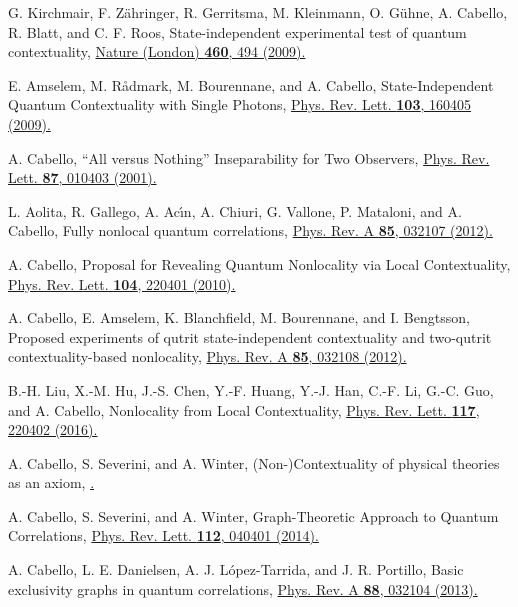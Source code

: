 \documentclass[%
 twocolumn,
 groupedaddress,
 showpacs,
 showkeys,
 preprintnumbers,
 amsmath,amssymb,
 aps,
 pra,
 longbibliography,
 floatfix,
 ]{revtex4-1}
\begin{document}
\begin{thebibliography}{99}
G. Kirchmair, F. Z\"{a}hringer, R. Gerritsma, M. Kleinmann, O. G\"{u}hne, A. Cabello, R. Blatt, and C. F. Roos,
State-independent experimental test of quantum contextuality,
\href{https://doi.org/10.1038/nature08172}{Nature (London) \textbf{460}, 494 (2009).}

E. Amselem, M. R{\aa}dmark, M. Bourennane, and A. Cabello,
State-Independent Quantum Contextuality with Single Photons,
\href{https://doi.org/10.1103/PhysRevLett.103.160405}{Phys. Rev. Lett. \textbf{103}, 160405 (2009).}

A. Cabello,
``All versus Nothing'' Inseparability for Two Observers,
\href{https://doi.org/10.1103/PhysRevLett.87.010403}{Phys. Rev. Lett. \textbf{87}, 010403 (2001).}

L. Aolita, R. Gallego, A. Ac\'{\i}n, A. Chiuri, G. Vallone, P. Mataloni, and A. Cabello,
Fully nonlocal quantum correlations,
\href{https://doi.org/10.1103/PhysRevA.85.032107}{Phys. Rev. A \textbf{85}, 032107 (2012).}

A. Cabello,
Proposal for Revealing Quantum Nonlocality via Local Contextuality,
\href{http://link.aps.org/doi/10.1103/PhysRevLett.104.220401}{Phys. Rev. Lett. \textbf{104}, 220401 (2010).}

A. Cabello, E. Amselem, K. Blanchfield, M. Bourennane, and I. Bengtsson,
Proposed experiments of qutrit state-independent contextuality and two-qutrit contextuality-based nonlocality,
\href{https://doi.org/10.1103/PhysRevA.85.032108}{Phys. Rev. A \textbf{85}, 032108 (2012).}

B.-H. Liu, X.-M. Hu, J.-S. Chen, Y.-F. Huang, Y.-J. Han, C.-F. Li, G.-C. Guo, and A. Cabello,
Nonlocality from Local Contextuality,
\href{https://doi.org/10.1103/PhysRevLett.117.220402}{Phys. Rev. Lett. \textbf{117}, 220402 (2016).}

A. Cabello, S. Severini, and A. Winter,
(Non-)Contextuality of physical theories as an axiom,
\href{https://arxiv.org/abs/1010.2163}{.}

A. Cabello, S. Severini, and A. Winter,
Graph-Theoretic Approach to Quantum Correlations,
\href{http://dx.doi.org/10.1103/PhysRevLett.112.040401}{Phys. Rev. Lett. \textbf{112}, 040401 (2014).}

A. Cabello, L. E. Danielsen, A. J. L\'opez-Tarrida, and J. R. Portillo,
Basic exclusivity graphs in quantum correlations,
\href{http://dx.doi.org/10.1103/PhysRevA.88.032104}{Phys. Rev. A \textbf{88}, 032104 (2013).}


\end{thebibliography}
\end{document}
